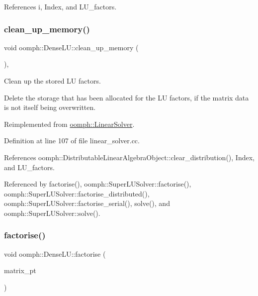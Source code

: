 References i, Index, and L\+U\+\_\+factors.

\mbox{\label{classoomph_1_1DenseLU_a5d4d454874476adadb3bc23913b1190b}} 
\subsubsection{\texorpdfstring{clean\+\_\+up\+\_\+memory()}{clean\_up\_memory()}}
{\footnotesize\ttfamily void oomph\+::\+Dense\+L\+U\+::clean\+\_\+up\+\_\+memory (\begin{DoxyParamCaption}{ }\end{DoxyParamCaption})\hspace{0.3cm}{\ttfamily [protected]}, {\ttfamily [virtual]}}



Clean up the stored LU factors. 

Delete the storage that has been allocated for the LU factors, if the matrix data is not itself being overwritten. 

Reimplemented from \hyperlink{classoomph_1_1LinearSolver_a9d66f3262e80ca06a365f98216afd85f}{oomph\+::\+Linear\+Solver}.



Definition at line 107 of file linear\+\_\+solver.\+cc.



References oomph\+::\+Distributable\+Linear\+Algebra\+Object\+::clear\+\_\+distribution(), Index, and L\+U\+\_\+factors.



Referenced by factorise(), oomph\+::\+Super\+L\+U\+Solver\+::factorise(), oomph\+::\+Super\+L\+U\+Solver\+::factorise\+\_\+distributed(), oomph\+::\+Super\+L\+U\+Solver\+::factorise\+\_\+serial(), solve(), and oomph\+::\+Super\+L\+U\+Solver\+::solve().

\mbox{\label{classoomph_1_1DenseLU_a943a629a67289120473855bc96766dfc}} 
\subsubsection{\texorpdfstring{factorise()}{factorise()}}
{\footnotesize\ttfamily void oomph\+::\+Dense\+L\+U\+::factorise (\begin{DoxyParamCaption}\item[{\hyperlink{classoomph_1_1DoubleMatrixBase}{Double\+Matrix\+Base} $\ast$const \&}]{matrix\+\_\+pt }\end{DoxyParamCaption})\hspace{0.3cm}{\ttfamily [protected]}}



